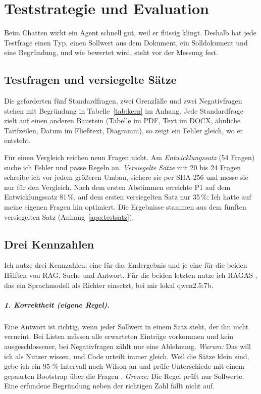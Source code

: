 
\chapter{Teststrategie und Evaluation}
\label{chap:evaluation}

Beim Chatten wirkt ein Agent schnell gut, weil er flüssig klingt. Deshalb hat jede Testfrage einen Typ, einen Sollwert aus dem Dokument, ein Solldokument und eine Begründung, und wie bewertet wird, steht vor der Messung fest.

\section{Testfragen und versiegelte Sätze}

Die geforderten fünf Standardfragen, zwei Grenzfälle und zwei Negativfragen stehen mit Begründung in Tabelle~\ref{tab:kern} im Anhang. Jede Standardfrage zielt auf einen anderen Baustein (Tabelle im PDF, Text im DOCX, ähnliche Tarifzeilen, Datum im Fließtext, Diagramm), so zeigt ein Fehler gleich, wo er entsteht.

Für einen Vergleich reichen neun Fragen nicht. Am \emph{Entwicklungssatz} (54 Fragen) suche ich Fehler und passe Regeln an. \emph{Versiegelte Sätze} mit 20 bis 24 Fragen schreibe ich vor jedem größeren Umbau, sichere sie per SHA-256 und messe sie nur für den Vergleich. Nach dem ersten Abstimmen erreichte P1 auf dem Entwicklungssatz 81\,\%, auf dem ersten versiegelten Satz nur 35\,\%: Ich hatte auf meine eigenen Fragen hin optimiert. Die Ergebnisse stammen aus dem fünften versiegelten Satz (Anhang~\ref{app:testsatz}).

\section{Drei Kennzahlen}
\label{sec:kpis}

Ich nutze drei Kennzahlen: eine für das Endergebnis und je eine für die beiden Hälften von RAG, Suche und Antwort. Für die beiden letzten nutze ich RAGAS \cite{es2024}, das ein Sprachmodell als Richter einsetzt, bei mir lokal qwen2.5:7b.

\paragraph{1. Korrektheit (eigene Regel).} Eine Antwort ist richtig, wenn jeder Sollwert in einem Satz steht, der ihn nicht verneint. Bei Listen müssen alle erwarteten Einträge vorkommen und kein ausgeschlossener, bei Negativfragen zählt nur eine Ablehnung. \emph{Warum:} Das will ich als Nutzer wissen, und Code urteilt immer gleich. Weil die Sätze klein sind, gebe ich ein 95-\%-Intervall nach Wilson an \cite{wilson1927} und prüfe Unterschiede mit einem gepaarten Bootstrap über die Fragen \cite{efron1993}. \emph{Grenze:} Die Regel prüft nur Sollwerte. Eine erfundene Begründung neben der richtigen Zahl fällt nicht auf.

